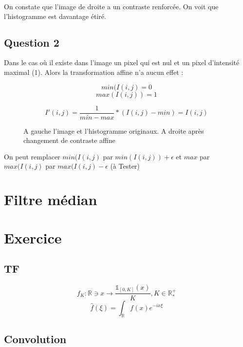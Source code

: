 \documentclass{article}
\begin{document}
On constate que l'image de droite a un contraste renforcée. On voit que l'histogramme est davantage étiré. 

\subsection*{Question 2}

Dans le cas où il existe dans l'image un pixel qui est nul et un pixel d'intensité maximal (1). Alors la transformation affine n'a aucun effet : 


$$min(I(i,j) = 0$$
$$max(I(i,j)) = 1$$
	
$$I'(i,j) = \frac{1}{min-max} * (I(i,j) - min) = I(i,j)$$


\begin{figure}[h]
		
	\caption{A gauche l'image et l'histogramme originaux. A droite après changement de contraste affine}
	
\end{figure}


On peut remplacer $min(I(i,j)$ par $min(I(i,j)) + \epsilon$ et $max$ par $max(I(i,j)$ par $max(I(i,j) - \epsilon$ (à Tester)


\section{Filtre médian}

\section{Exercice}
\subsection{TF}
$$ f_K : \mathbb{R} \ni x \rightarrow \frac{\mathds{1}_{[0, K]}(x)}{K}, K \in \mathbb{R}_*^+ $$
$$ \hat{f}(\xi) = \int_\mathbb{R} f(x) e^{-ix\xi}$$
\subsection{Convolution}
\end{document}
